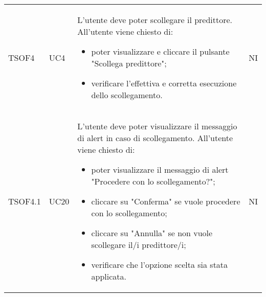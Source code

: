 \begin{longtable}{C{2.5cm} C{2.5cm} L{8cm} C{2cm}}

TSOF4 &
UC4 &
L'utente  deve poter scollegare il predittore. All'utente viene chiesto di:
\begin{itemize}
	\item poter visualizzare e cliccare il pulsante "Scollega predittore";
	\item verificare l'effettiva e corretta esecuzione dello scollegamento.
\end{itemize}&
NI \\


TSOF4.1 &
UC20 &
L'utente  deve poter visualizzare il messaggio di alert in caso di scollegamento. All'utente viene chiesto di:
\begin{itemize}
	\item poter visualizzare il messaggio di alert "Procedere con lo scollegamento?";
	\item cliccare su "Conferma" se vuole procedere con lo scollegamento;
	\item cliccare su "Annulla" se non vuole scollegare il/i predittore/i;
	\item verificare che l’opzione scelta sia stata applicata.
\end{itemize}&
NI \\



\end{longtable}
